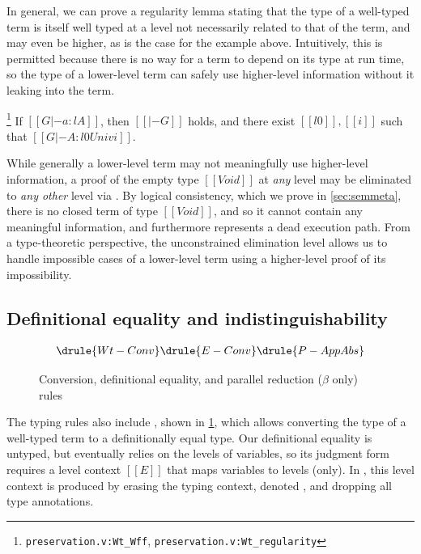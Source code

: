 \documentclass[acmsmall, screen=true, nonacm=true,
  review=\ifpublic false\else true\fi,
  anonymous=\ifanonymous true\else false\fi
]{acmart}
\newcommand{\suppl}[3]{{\scriptsize\texttt{#2:#3}}}
\newcommand{\judgement}[1]{{\setlength{\fboxsep}{1.5pt}\fbox{#1}}}
\newlength{\punctwidth}
\newcommand{\stack}[1]{%
  \settowidth{\punctwidth}{#1}%
  \hspace*{-\the\punctwidth}%
}
\begin{document}
In general, we can prove a regularity lemma stating that the type of a well-typed term
is itself well typed at a level not necessarily related to that of the term,
and may even be higher, as is the case for the example above.
Intuitively, this is permitted because there is no way for a term to depend on its type at run time,
so the type of a lower-level term can safely use higher-level information
without it leaking into the term.

\begin{lemma}[Regularity]
  \stack{.~}\footnote{\suppl{theories}{preservation.v}{Wt\_Wff}, \suppl{theories}{preservation.v}{Wt\_regularity}}
  \label{lem:regularity}
  If $[[G |- a : l A]]$, then $[[|- G]]$ holds,
  and there exist $[[l0]], [[i]]$
  such that $[[G |- A : l0 Univ i]]$.
\end{lemma}

While generally a lower-level term may not meaningfully use higher-level information,
a proof of the empty type $[[Void]]$ at \emph{any} level
may be eliminated to \emph{any other} level via .
By logical consistency, which we prove in \cref{sec:semmeta},
there is no closed term of type $[[Void]]$,
and so it cannot contain any meaningful information,
and furthermore represents a dead execution path.
From a type-theoretic perspective,
the unconstrained elimination level allows us to handle impossible cases of a lower-level term
using a higher-level proof of its impossibility.

\subsection{Definitional equality and indistinguishability} \label{sec:indist}

\begin{figure}[h]
  \begin{gather*}
    \drule{Wt-Conv}
    \drule{E-Conv}
    \drule{P-AppAbs}
  \end{gather*}
  \caption{Conversion, definitional equality, and parallel reduction ($\beta$ only) rules}
  \Description{}
  \label{fig:conv}
\end{figure}

The typing rules also include , shown in \cref{fig:conv},
which allows converting the type of a well-typed term to a definitionally equal type.
Our definitional equality is untyped, but eventually relies on the levels of variables,
so its judgment form \judgement{$[[E |- a == b]]$} requires a level context $[[E]]$ that maps variables to levels (only).
In , this level context is produced by erasing the typing context,
denoted \judgement{$[[| G |]]$}, and dropping all type annotations.
\end{document}
